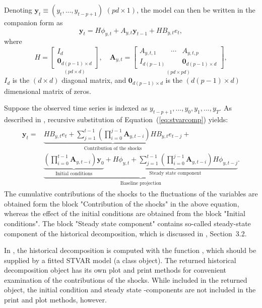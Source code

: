\documentclass[nojss]{jss}
\begin{document}
Denoting $\boldsymbol{y}_t\equiv(y_t,...,y_{t-p+1})$ $(pd\times 1)$, the model can then be written in the companion form as
\begin{equation}\label{eq:stvarcomp}
\boldsymbol{y}_t = H\phi_{y,t} + A_{y,t}\boldsymbol{y}_{t-1} + HB_{y,t}e_t,
\end{equation}
where
\begin{equation}
H =\underset{(pd\times d)}{\begin{bmatrix}
  I_d \\
  \boldsymbol{0}_{d(p-1)\times d}
\end{bmatrix}},\quad
\boldsymbol{A}_{y,t} = \underset{(pd\times pd)}{\begin{bmatrix}
  A_{y,t,1}  & \cdots & A_{y,t,p} \\
  I_{d(p-1)} &        & \boldsymbol{0}_{d(p-1)\times d}
\end{bmatrix}},
\end{equation}
$I_d$ is the $(d\times d)$ diagonal matrix, and $\boldsymbol{0}_{d(p-1)\times d}$ is the $(d(p-1)\times d)$ dimensional matrix of zeros.

Suppose the observed time series is indexed as $y_{t-p+1},...,y_{0},y_1,...,y_T$. As described in \citet[][Section~2]{Wong:2018}, recursive substitution of Equation~(\ref{eq:stvarcomp}) yields:
\begin{align}
\begin{aligned}
\boldsymbol{y}_t =& \underbrace{HB_{y,t}e_t + \sum_{j=1}^{t-1}\left(\prod_{i=0}^{j-1} \boldsymbol{A}_{y,t-i}\right)HB_{y,t}e_{t-j}}_{\text{Contribution of the shocks}} + \\
 & \underbrace{\underbrace{\left(\prod_{i=0}^{t-1} \boldsymbol{A}_{y,t-i}\right)\boldsymbol{y}_{0}}_{\text{Initial conditions}} + \underbrace{H\phi_{y,t} + \sum_{j=1}^{t-1}\left(\prod_{i=0}^{j-1}\boldsymbol{A}_{y,t-i}\right)H\phi_{y,t-j}}_{\text{Steady state component}}}_{\text{Baseline projection}}.
\end{aligned}
\end{align}
The cumulative contributions of the shocks to the fluctuations of the variables are obtained form the block "Contribution of the shocks" in the above equation, whereas the effect of the initial conditions are obtained from the block "Initial conditions". The block "Steady state component" contains so-called steady-state component of the historical decomposition, which is discussed in \cite{Wong:2018}, Section~3.2.

In , the historical decomposition is computed with the function , which should be supplied by a fitted STVAR model (a class  object). The returned historical decomposition object has its own plot and print methods for convenient examination of the contributions of the shocks. While included in the returned object, the initial condition and steady state -components are not included in the print and plot methods, however.
\end{document}
